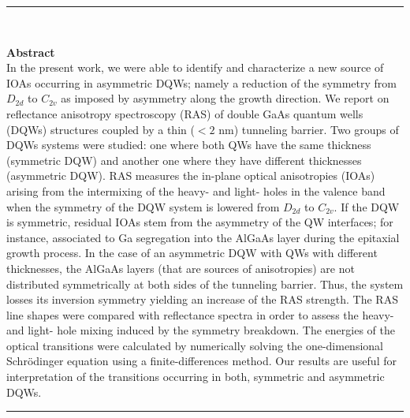 \cleardoublepage
\vspace{-5cm}
\begin{vcentrepage}
	\noindent\rule[2pt]{\textwidth}{0.8pt}\\
	\begin{center}
		{\Large\textbf{}}
	\end{center}
	{\large\textbf{Abstract}}\\
	In the present work, we were able to identify and characterize a new source of IOAs occurring in asymmetric DQWs; namely a reduction of the symmetry from $D_{2d}$ to $C_{2v}$ as imposed by asymmetry along the growth direction.
	We report  on reflectance anisotropy spectroscopy (RAS) of  double GaAs quantum wells (DQWs)  structures coupled by a thin ($<2$ nm) tunneling  barrier. Two groups of DQWs systems were studied: one where both QWs have the same thickness (symmetric DQW) and another one where they have different thicknesses (asymmetric DQW). RAS measures the in-plane optical anisotropies (IOAs) arising from the intermixing of the heavy- and light- holes in the valence band when the symmetry of the DQW system is lowered from $D_{2d}$ to $C_{2v}$. If the DQW is symmetric, residual IOAs stem from the asymmetry of the QW  interfaces; for instance, associated to Ga segregation into the AlGaAs layer during the epitaxial growth process. In the case of an asymmetric DQW with QWs with different thicknesses, the AlGaAs layers (that are sources of anisotropies) are not distributed symmetrically at both sides of the tunneling barrier. Thus, the system losses its inversion symmetry  yielding an increase of the RAS strength. The RAS line shapes were compared with reflectance spectra in order to assess the heavy- and light- hole mixing induced by the  symmetry breakdown. The energies of the optical transitions were calculated by numerically solving the one-dimensional Schrödinger equation using a finite-differences method. Our results are useful for interpretation of the transitions occurring in both, symmetric and asymmetric DQWs.
	
	\noindent\rule[2pt]{\textwidth}{0.8pt}
\end{vcentrepage}


%